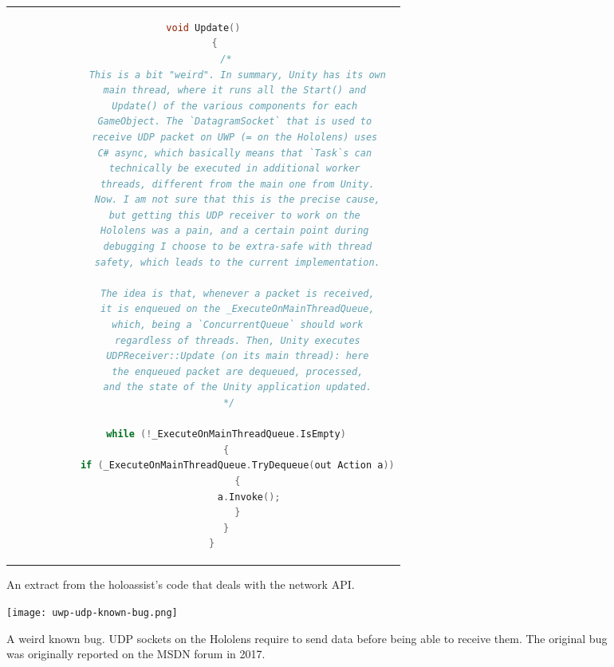 \begin{figure}
  \centering
  \begin{tabular}{c}
  \begin{lstlisting}[language=c]
    void Update()
    {
        /*
            This is a bit "weird". In summary, Unity has its own
            main thread, where it runs all the Start() and 
            Update() of the various components for each 
            GameObject. The `DatagramSocket` that is used to 
            receive UDP packet on UWP (= on the Hololens) uses 
            C# async, which basically means that `Task`s can 
            technically be executed in additional worker 
            threads, different from the main one from Unity.
            Now. I am not sure that this is the precise cause,
            but getting this UDP receiver to work on the 
            Hololens was a pain, and a certain point during 
            debugging I choose to be extra-safe with thread
            safety, which leads to the current implementation.

            The idea is that, whenever a packet is received,
            it is enqueued on the _ExecuteOnMainThreadQueue,
            which, being a `ConcurrentQueue` should work
            regardless of threads. Then, Unity executes
            UDPReceiver::Update (on its main thread): here
            the enqueued packet are dequeued, processed,
            and the state of the Unity application updated.
         */

        while (!_ExecuteOnMainThreadQueue.IsEmpty)
        {
            if (_ExecuteOnMainThreadQueue.TryDequeue(out Action a))
            {
                a.Invoke();
            }
        }
    } 
  \end{lstlisting}
  \end{tabular}
  \caption{An extract from the \gls{holoassist}'s code that deals with the network \gls{API}.}\label{lst:udp_manager_update_method}
\end{figure}

\begin{figure}[p]
  \centering
  \texttt{[image: uwp-udp-known-bug.png]}
  \caption{A weird known bug\cite{noauthor_sockets_nodate}. \gls{UDP} sockets on the Hololens require to send data before being able to receive them. The original bug was originally reported on the MSDN forum in 2017\cite{osthege_datagramsocketmessagereceived_2017}.}\label{fig:uwp_weird_bug}
\end{figure}

